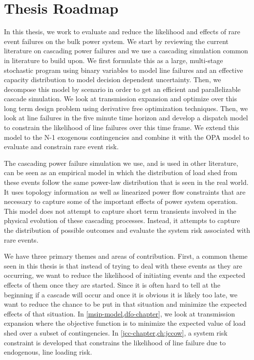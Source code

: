\section{Thesis Roadmap}

In this thesis, we work to evaluate and reduce the likelihood and effects of rare event failures on the bulk power system.  We start by reviewing the current literature on cascading power failures and we use a cascading simulation common in literature to build upon. We first formulate this as a large, multi-stage stochastic program using binary variables to model line failures and an effective capacity distribution to model decision dependent uncertainty.  Then, we decompose this model by scenario in order to get an efficient and parallelizable cascade simulation.  We look at transmission expansion and optimize over this long term design problem using derivative free optimization techniques.  Then, we look at line failures in the five minute time horizon and develop a dispatch model to constrain the likelihood of line failures over this time frame.  We extend this model to the N-1 exogenous contingencies and combine it with the OPA model to evaluate and constrain rare event risk.

The cascading power failure simulation we use, and is used in other literature, can be seen as an empirical model in which the distribution of load shed from these events follow the same power-law distribution that is seen in the real world.  It uses topology information as well as linearized power flow constraints that are necessary to capture some of the important effects of power system operation.  This model does not attempt to capture short term transients involved in the physical evolution of these cascading processes.  Instead, it attempts to capture the distribution of possible outcomes and evaluate the system risk associated with rare events.

We have three primary themes and areas of contribution.  First, a common theme seen in this thesis is that instead of trying to deal with these events as they are occurring, we want to reduce the likelihood of initiating events and the expected effects of them once they are started.  Since it is often hard to tell at the beginning if a cascade will occur and once it is obvious it is likely too late, we want to reduce the chance to be put in that situation and minimize the expected effects of that situation.  In \cref{msip-model,dfo-chapter}, we look at transmission expansion where the objective function is to minimize the expected value of load shed over a subset of contingencies.  In \cref{jcc-chapter,ch:jccow}, a system risk constraint is developed that constrains the likelihood of line failure due to endogenous, line loading risk.  


